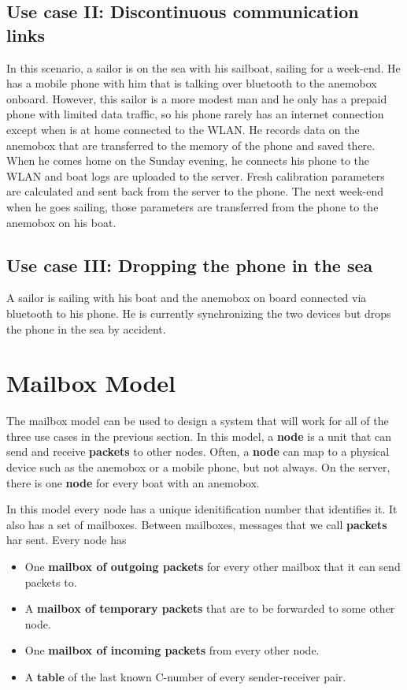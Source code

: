 \documentclass{article}
\begin{document}
\subsection{Use case II: Discontinuous communication links}
\label{sec:hardcase}
In this scenario, a sailor is on the sea with his sailboat, sailing for a week-end. He has a mobile phone with him that is talking over bluetooth to the anemobox onboard. However, this sailor is a more modest man and he only has a prepaid phone with limited data traffic, so his phone rarely has an internet connection except when is at home connected to the WLAN. He records data on the anemobox that are transferred to the memory of the phone and saved there. When he comes home on the Sunday evening, he connects his phone to the WLAN and boat logs are uploaded to the server. Fresh calibration parameters are calculated and sent back from the server to the phone. The next week-end when he goes sailing, those parameters are transferred from the phone to the anemobox on his boat.

\subsection{Use case III: Dropping the phone in the sea}
A sailor is sailing with his boat and the anemobox on board connected via bluetooth to his phone. He is currently synchronizing the two devices but drops the phone in the sea by accident.

\section{Mailbox Model}
The mailbox model can be used to design a system that will work for all of the three use cases in the previous section. In this model, a \textbf{node} is a unit that can send and receive \textbf{packets} to other nodes. Often, a \textbf{node} can map to a physical device such as the anemobox or a mobile phone, but not always. On the server, there is one \textbf{node} for every boat with an anemobox.

In this model every node has a unique idenitification number that identifies it. It also has a set of mailboxes. Between mailboxes, messages that we call \textbf{packets} har sent. Every node has
\begin{itemize}
  \item One \textbf{mailbox of outgoing packets} for every other mailbox that it can send packets to.
  \item A \textbf{mailbox of temporary packets} that are to be forwarded to some other node.
  \item One \textbf{mailbox of incoming packets} from every other node.
  \item A \textbf{table} of the last known C-number of every sender-receiver pair.
\end{itemize}
\end{document}
